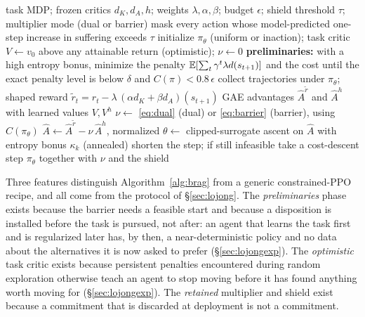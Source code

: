 \begin{algorithm}[t]
\caption{\BRAG{} (one training run)}
\label{alg:brag}
\begin{algorithmic}[1]
\Require task MDP; frozen critics $d_K,d_A,h$; weights $\lambda,\alpha,\beta$; budget $\epsilon$; shield threshold $\tau$; multiplier mode (dual or barrier)
\State mask every action whose model-predicted one-step increase in suffering exceeds $\tau$ 
\State initialize $\pi_\theta$ (uniform or inaction); task critic $V\gets v_0$ above any attainable return (optimistic); $\nu\gets0$
\State \textbf{preliminaries:} with a high entropy bonus, minimize the penalty $\mathbb{E}[\sum_t\gamma^t\lambda d(s_{t+1})]$ and the cost until the exact penalty level is below $\delta$ and $C(\pi)<0.8\,\epsilon$ 
  \State collect trajectories under $\pi_\theta$; shaped reward $\tilde r_t=r_t-\lambda\,(\alpha d_K+\beta d_A)(s_{t+1})$
  \State GAE advantages $\hat A^{\tilde r}$ and $\hat A^{h}$ with learned values $V,V^h$
  \State $\nu\gets$ \eqref{eq:dual} (dual) or \eqref{eq:barrier} (barrier), using $C(\pi_\theta)$
  \State $\hat A\gets\hat A^{\tilde r}-\nu\,\hat A^{h}$, normalized
  \State $\theta\gets$ clipped-surrogate ascent on $\hat A$ with entropy bonus $\kappa_k$ (annealed) 
   shorten the step; if still infeasible take a cost-descent step \EndIf
\EndFor
\State \Return $\pi_\theta$ together with $\nu$ and the shield 
\end{algorithmic}
\end{algorithm}

Three features distinguish Algorithm~\ref{alg:brag} from a generic constrained-PPO recipe, and all come from the protocol of \S\ref{sec:lojong}.
The \emph{preliminaries} phase exists because the barrier needs a feasible start and because a disposition is installed before the task is pursued, not after: an agent that learns the task first and is regularized later has, by then, a near-deterministic policy and no data about the alternatives it is now asked to prefer (\S\ref{sec:lojongexp}).
The \emph{optimistic} task critic exists because persistent penalties encountered during random exploration otherwise teach an agent to stop moving before it has found anything worth moving for (\S\ref{sec:lojongexp}).
The \emph{retained} multiplier and shield exist because a commitment that is discarded at deployment is not a commitment.

